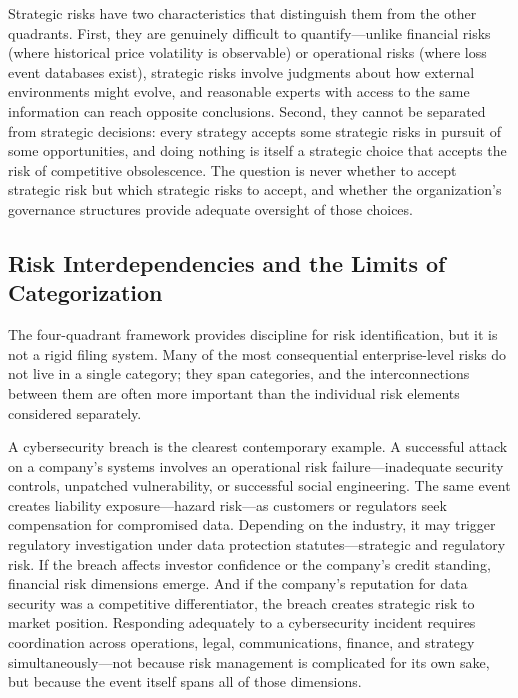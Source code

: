 \documentclass[11pt,openany]{book}
\begin{document}
Strategic risks have two characteristics that distinguish them from the other quadrants. First, they are genuinely difficult to quantify---unlike financial risks (where historical price volatility is observable) or operational risks (where loss event databases exist), strategic risks involve judgments about how external environments might evolve, and reasonable experts with access to the same information can reach opposite conclusions. Second, they cannot be separated from strategic decisions: every strategy accepts some strategic risks in pursuit of some opportunities, and doing nothing is itself a strategic choice that accepts the risk of competitive obsolescence. The question is never whether to accept strategic risk but which strategic risks to accept, and whether the organization's governance structures provide adequate oversight of those choices.

\subsection{Risk Interdependencies and the Limits of Categorization}
\label{subsec:interdependencies}

The four-quadrant framework provides discipline for risk identification, but it is not a rigid filing system. Many of the most consequential enterprise-level risks do not live in a single category; they span categories, and the interconnections between them are often more important than the individual risk elements considered separately.

A cybersecurity breach is the clearest contemporary example. A successful attack on a company's systems involves an operational risk failure---inadequate security controls, unpatched vulnerability, or successful social engineering. The same event creates liability exposure---hazard risk---as customers or regulators seek compensation for compromised data. Depending on the industry, it may trigger regulatory investigation under data protection statutes---strategic and regulatory risk. If the breach affects investor confidence or the company's credit standing, financial risk dimensions emerge. And if the company's reputation for data security was a competitive differentiator, the breach creates strategic risk to market position. Responding adequately to a cybersecurity incident requires coordination across operations, legal, communications, finance, and strategy simultaneously---not because risk management is complicated for its own sake, but because the event itself spans all of those dimensions.
\end{document}
